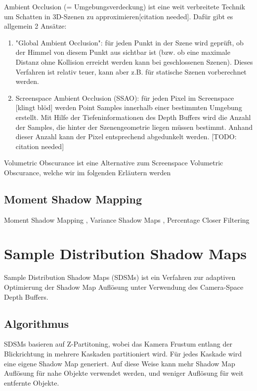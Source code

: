 \documentclass[runningheaders,a4paper]{llncs}
\begin{document}
Ambient Occlusion (= Umgebungsverdeckung) ist eine weit verbreitete Technik um Schatten in 3D-Szenen
zu approximieren[citation needed]. Dafür gibt es allgemein 2 Ansätze:
\begin{enumerate}
	\item "Global Ambient Occlusion": für jeden Punkt in der Szene wird geprüft, ob der Himmel von diesem
		Punkt aus sichtbar ist (bzw. ob eine maximale Distanz ohne Kollision erreicht werden kann bei geschlossenen
		Szenen). Dieses Verfahren ist relativ teuer, kann aber z.B. für statische Szenen vorberechnet werden.
	\item Screenspace Ambient Occlusion (SSAO): für jeden Pixel im Screenspace [klingt blöd] werden Point Samples
		innerhalb einer bestimmten Umgebung erstellt. Mit Hilfe der Tiefeninformationen des Depth Buffers
		wird die Anzahl der Samples, die hinter der Szenengeometrie liegen müssen bestimmt. Anhand dieser Anzahl
		kann der Pixel entsprechend abgedunkelt werden. 
	[TODO: citation needed]
\end{enumerate}  
Volumetric Obscurance ist eine Alternative zum Screenspace Volumetric Obscurance, welche wir im folgenden
Erläutern werden

\cite{loos2010volumetric}

\subsection{Moment Shadow Mapping}

Moment Shadow Mapping \cite{msm}, Variance Shadow Maps \cite{donnelly2006variance}, Percentage Closer Filtering \cite{reeves1987rendering}



\section{Sample Distribution Shadow Maps}

Sample Distribution Shadow Maps (SDSMs) ist ein Verfahren zur adaptiven Optimierung der Shadow Map Auflösung unter Verwendung des Camera-Space Depth Buffers.

\subsection{Algorithmus}

SDSMs basieren auf Z-Partitoning, wobei das Kamera Frustum entlang der Blickrichtung in mehrere Kaskaden partitioniert wird. Für jedes Kaskade wird eine eigene Shadow Map generiert.
Auf diese Weise kann mehr Shadow Map Auflösung für nahe Objekte verwendet werden, und weniger Auflösung für weit entfernte Objekte.
\end{document}
